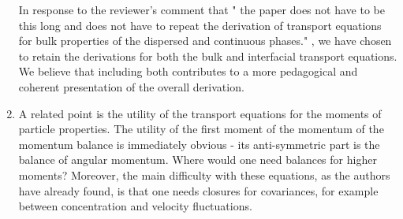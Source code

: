 \documentclass[10pt,a4paper]{article}
\begin{document}
\begin{enumerate}
{        In response to the reviewer’s comment that " the paper does not have to be this long and
        does not have to repeat the derivation of transport equations for bulk properties of the
        dispersed and continuous phases." , we have chosen to retain the derivations for both the bulk and interfacial transport equations. 
        We believe that including both contributes to a more pedagogical and coherent presentation of the overall derivation.
        
    }
    \item A related point is the utility of the transport equations for the moments of particle
    properties. The utility of the first moment of the momentum of the momentum balance is
    immediately obvious - its anti-symmetric part is the balance of angular momentum. Where
    would one need balances for higher moments? Moreover, the main difficulty with these
    equations, as the authors have already found, is that one needs closures for covariances, for
    example between concentration and velocity fluctuations.
    

\end{enumerate}
\end{document}
